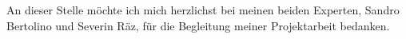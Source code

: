 \documentclass[
  11pt, %
  oneside, %
  ngerman, %
  singlespacing, %
  liststotoc, %
  headsepline, %
]{MastersDoctoralThesis} %
\begin{document}

\begin{acknowledgements}
  \addchaptertocentry{\acknowledgementname} %

  An dieser Stelle möchte ich mich herzlichst bei meinen beiden Experten,
  Sandro Bertolino und Severin Räz, für die Begleitung meiner Projektarbeit
  bedanken.
\end{acknowledgements}


\tableofcontents %

\listoffigures %

\listoftables %




\mainmatter %

\pagestyle{thesis} %










\appendix %
\end{document}
